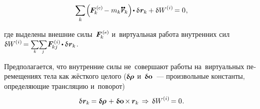 \begin{otherlanguage}{russian}
\nopagebreak\vspace{-0.2em}\begin{equation}\label{discrete:principleofvirtualwork.externalinternal}
\displaystyle \sum_k \hspace{-0.2ex} \left(^{\mathstrut} \hspace{-0.25ex} \bm{F}^{\expexternal}_{\hspace{-0.16ex}k} \hspace{-0.1ex} - m_k \mathdotdotabove{\bm{r}}_k \right) \hspace{-0.32ex} \dotp \variation{\hspace{.1ex}\bm{r}_k} \hspace{-0.1ex}
+ \variation{\internalwork} \hspace{-0.1ex} = 0 \hspace{.1ex},
\vspace{-0.25em}\end{equation}

\vspace{-0.1em} \noindent где выделены внешние силы~${\bm{F}^{\expexternal}_{\hspace{-0.16ex}k}}$ и~виртуальная работа внутренних сил
${\variation{\internalwork} \hspace{-0.12ex} = \scalebox{0.8}[0.84]{$\displaystyle \underset{\raisemath{.25ex}{\smash{k}}}{\sum}$} \scalebox{0.8}[0.84]{$\displaystyle \underset{\raisemath{.25ex}{\smash{j}}}{\sum}$} \hspace{.12ex} \bm{F}^{\expinternal}_{\hspace{-0.16ex}kj} \hspace{-0.1ex} \dotp \variation{\hspace{.1ex}\bm{r}_k} \hspace{.1ex}}$.

\vspace{-0.1em} Предполагается, что внутренние силы не~совершают работы на~виртуальных перемещениях тела как жёсткого целого (${\bm{\updelta}\hspace{-0.125ex}\bm{\mathrm{\hspace{-0.1ex}\bm{\rho}}}}$ и~${\bm{\updelta}\hspace{-0.125ex}\bm{\mathrm{\bm{o}}}}$~--- произвольные константы, определяющие трансляцию и~поворот)

\nopagebreak\vspace{-0.8em}\begin{equation}\label{assumptionforvirtualwork}
\variation{\hspace{.1ex}\bm{r}_k} \hspace{-0.16ex}
= \varvector{\hspace{-0.1ex}\bm{\rho}} \hspace{.2ex} + \hspace{.12ex} \varvector{\bm{o}} \hspace{-0.2ex} \times \hspace{-0.1ex} \bm{r}_k
\hspace{.32ex} \Rightarrow \hspace{.4ex}
\variation{\internalwork} \hspace{-0.1ex} = 0 \hspace{.1ex}.
\end{equation}


\end{otherlanguage}
